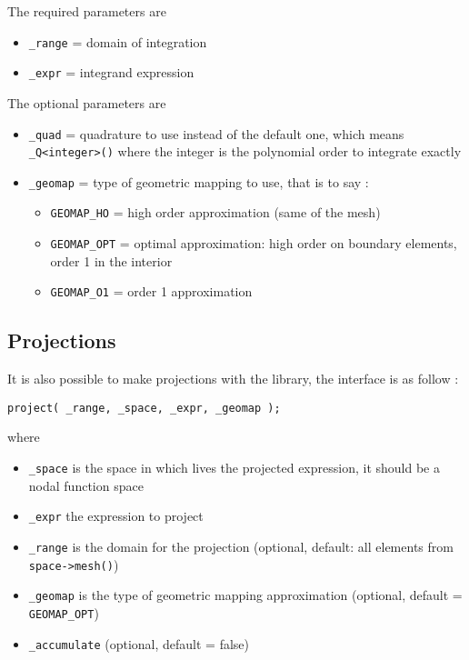 \noindent The required parameters are
\begin{itemize}
 \item \lstinline!_range!  = domain of integration
 \item \lstinline!_expr!  = integrand expression
\end{itemize}
The optional parameters are
\begin{itemize}
 \item \lstinline!_quad!  = quadrature to use instead of the default one, which means \lstinline!_Q<integer>()! where the integer is the polynomial order to integrate exactly
 \item \lstinline!_geomap!  = type of geometric mapping to use, that is to say :
	\begin{itemize}
  	\item \lstinline!GEOMAP_HO!  =  high order approximation (same of the mesh)
  	\item \lstinline!GEOMAP_OPT!  = optimal approximation: high order on boundary elements, order 1 in the interior
  	\item \lstinline!GEOMAP_O1!  = order 1 approximation
	\end{itemize}
\end{itemize}


\subsection{Projections}
\label{keywords:projections}
It is also possible to make projections with the library, the interface is as follow :
\begin{lstlisting}
project( _range, _space, _expr, _geomap );
\end{lstlisting}
where
\begin{itemize}
 \item \lstinline!_space!  is the space in which lives the projected expression, it should be a nodal function space
  \item \lstinline!_expr!  the expression to project
  \item \lstinline!_range!  is the domain for the projection (optional, default: all elements from \lstinline!space->mesh()!) 
  \item \lstinline!_geomap!  is the type of geometric mapping approximation (optional, default = \lstinline!GEOMAP_OPT!)
  \item \lstinline!_accumulate!  (optional, default = false)
\end{itemize}

